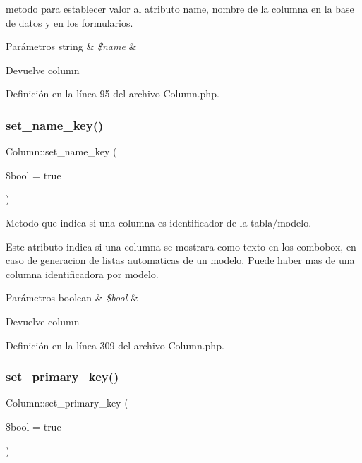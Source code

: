 metodo para establecer valor al atributo name, nombre de la columna en la base de datos y en los formularios.


\begin{DoxyParams}[1]{Parámetros}
string & {\em \$name} & \\
\hline
\end{DoxyParams}
\begin{DoxyReturn}{Devuelve}
column 
\end{DoxyReturn}


Definición en la línea 95 del archivo Column.\+php.

\mbox{\label{class_column_a8ecb11e158dea1d54dd042c593e96f0e}} 
\subsubsection{\texorpdfstring{set\_name\_key()}{set\_name\_key()}}
{\footnotesize\ttfamily Column\+::set\+\_\+name\+\_\+key (\begin{DoxyParamCaption}\item[{}]{\$bool = {\ttfamily true} }\end{DoxyParamCaption})}

Metodo que indica si una columna es identificador de la tabla/modelo.

Este atributo indica si una columna se mostrara como texto en los combobox, en caso de generacion de listas automaticas de un modelo. Puede haber mas de una columna identificadora por modelo.


\begin{DoxyParams}[1]{Parámetros}
boolean & {\em \$bool} & \\
\hline
\end{DoxyParams}
\begin{DoxyReturn}{Devuelve}
column 
\end{DoxyReturn}


Definición en la línea 309 del archivo Column.\+php.

\mbox{\label{class_column_a58d41e83c8ef7f3a021e1070f2e98cd3}} 
\subsubsection{\texorpdfstring{set\_primary\_key()}{set\_primary\_key()}}
{\footnotesize\ttfamily Column\+::set\+\_\+primary\+\_\+key (\begin{DoxyParamCaption}\item[{}]{\$bool = {\ttfamily true} }\end{DoxyParamCaption})}

